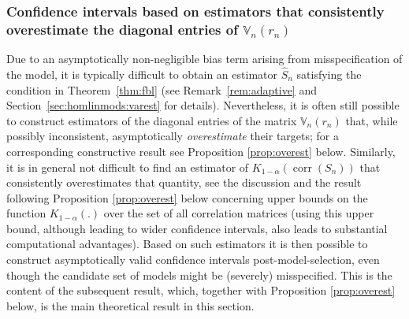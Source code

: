 \documentclass[preprint]{imsart}
\DeclareMathOperator{\corr}{corr}
\numberwithin{equation}{section}
\begin{document}
\subsubsection{Confidence intervals based on estimators that consistently overestimate the diagonal entries of $\mathbb{V}_n(r_n)$}\label{sec:overest}

Due to an asymptotically non-negligible bias term arising from misspecification of the model, it is typically difficult to obtain an estimator $\hat{S}_n$ satisfying the condition in Theorem~\ref{thm:fbl} (see Remark~\ref{rem:adaptive} and Section~\ref{sec:homlinmods:varest} for details). Nevertheless, it is often still possible to construct estimators of the diagonal entries of the matrix $\mathbb{V}_n(r_n)$ that, while possibly inconsistent, asymptotically \textit{overestimate} their targets; for a corresponding constructive result see Proposition \ref{prop:overest} below. Similarly, it is in general not difficult to find an estimator of $K_{1-\alpha}(\corr(S_n))$ that consistently overestimates that quantity, see the discussion and the result following Proposition \ref{prop:overest} below concerning upper bounds on the function $K_{1-\alpha}(.)$ over the set of all correlation matrices (using this upper bound, although leading to wider confidence intervals, also leads to substantial computational advantages). Based on such estimators it is then possible to construct asymptotically valid confidence intervals post-model-selection, even though the candidate set of models might be (severely) misspecified. This is the content of the subsequent result, which, together with Proposition \ref{prop:overest} below, is the main theoretical result in this section.
\end{document}

